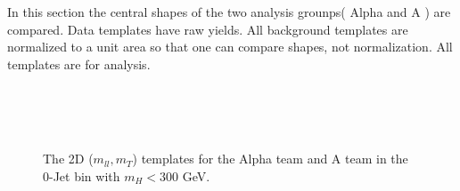 In this section the central shapes of the two analysis grounps( Alpha and A ) are compared.  
Data templates have raw yields. All background templates are normalized to a unit area so that one can 
compare shapes, not normalization. All templates are for  \GeV analysis.

\begin{figure}[!hbtp]
\centering

 \\
 \\
 \\

\caption{ The 2D ($m_{ll}, m_T$) templates for the Alpha team and A team in the 0-Jet bin with $m_H<300$ GeV. }
\label{fig:compare_temlates_0j}
\end{figure}

